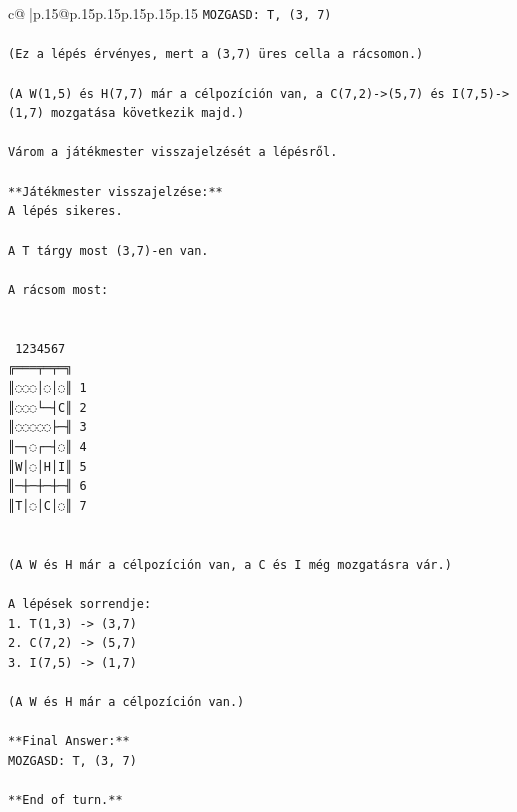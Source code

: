 \documentclass{article}
\begin{document}
{\begin{supertabular}{c@{$\;$}|p{.15\linewidth}@{}p{.15\linewidth}p{.15\linewidth}p{.15\linewidth}p{.15\linewidth}p{.15\linewidth}}
{{{\texttt{MOZGASD: T, (3, 7)  } \\
\\ 
\texttt{(Ez a lépés érvényes, mert a (3,7) üres cella a rácsomon.)  } \\
\\ 
\texttt{(A W(1,5) és H(7,7) már a célpozíción van, a C(7,2){-}>(5,7) és I(7,5){-}>(1,7) mozgatása következik majd.)  } \\
\\ 
\texttt{Várom a játékmester visszajelzését a lépésről.  } \\
\\ 
\texttt{**Játékmester visszajelzése:**  } \\
\texttt{A lépés sikeres.  } \\
\\ 
\texttt{A T tárgy most (3,7){-}en van.  } \\
\\ 
\texttt{A rácsom most:  } \\
\\ 
\\ 
\texttt{ 1234567} \\
\texttt{╔═══╤═╤═╗} \\
\texttt{║◌◌◌│◌│◌║ 1} \\
\texttt{║◌◌◌└─┤C║ 2} \\
\texttt{║◌◌◌◌◌├─╢ 3} \\
\texttt{║─┐◌┌─┤◌║ 4} \\
\texttt{║W│◌│H│I║ 5} \\
\texttt{║─┼─┼─┼─╢ 6} \\
\texttt{║T│◌│C│◌║ 7} \\
\\ 
\\ 
\texttt{(A W és H már a célpozíción van, a C és I még mozgatásra vár.)  } \\
\\ 
\texttt{A lépések sorrendje:  } \\
\texttt{1. T(1,3) {-}> (3,7)  } \\
\texttt{2. C(7,2) {-}> (5,7)  } \\
\texttt{3. I(7,5) {-}> (1,7)  } \\
\\ 
\texttt{(A W és H már a célpozíción van.)  } \\
\\ 
\texttt{**Final Answer:**  } \\
\texttt{MOZGASD: T, (3, 7)  } \\
\\ 
\texttt{**End of turn.**  } \\
}}}
\end{supertabular}}
\end{document}
